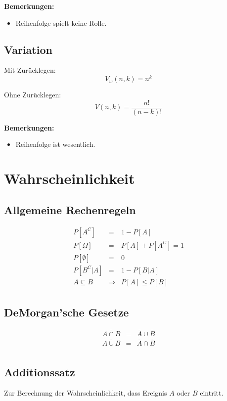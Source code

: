 \documentclass[10pt,a4paper,twocolumn]{article}
\begin{document}
\textbf{Bemerkungen:}
\begin{itemize}
\item Reihenfolge spielt keine Rolle.
\end{itemize}

\subsection{Variation}
Mit Zurücklegen:
\[
V_w(n,k)=n^k
\]

Ohne Zurücklegen:
\[
V(n,k)=\frac{n!}{(n-k)!}
\]

\textbf{Bemerkungen:}
\begin{itemize}
\item Reihenfolge ist wesentlich.
\end{itemize}

\section{Wahrscheinlichkeit}

\subsection{Allgemeine Rechenregeln}
\[
\begin{array}{rcl}
	P\left[A^C\right] & = & 1-P[A] \\
	P\left[\Omega\right] & = & P[A]+P\left[A^C\right]=1 \\
	P[\emptyset] & = & 0 \\
	P\left[B^C|A\right] & = & 1-P[B|A] \\
	A\subseteq B & \Rightarrow & P[A] \leq P[B] \\
\end{array}
\]

\subsection{DeMorgan'sche Gesetze}
\[
\begin{array}{rcl}
	\overline{A\cap B} & = & \overline{A}\cup\overline{B} \\
	\overline{A\cup B} & = & \overline{A}\cap\overline{B}\\
\end{array}
\]

\subsection{Additionssatz}
Zur Berechnung der Wahrscheinlichkeit, dass Ereignis $A$ oder $B$ eintritt.
\end{document}
